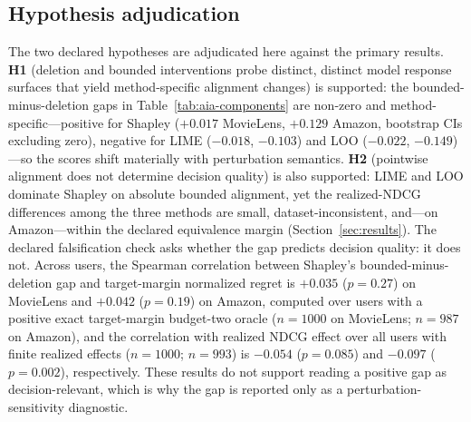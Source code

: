 \documentclass[manuscript,screen,review,anonymous]{acmart}
\begin{document}
\subsection{Hypothesis adjudication}
The two declared hypotheses are adjudicated here against the primary results. \textbf{H1} (deletion and bounded interventions probe distinct, distinct model response surfaces that yield method-specific alignment changes) is supported: the bounded-minus-deletion gaps in Table~\ref{tab:aia-components} are non-zero and method-specific---positive for Shapley ($+0.017$ MovieLens, $+0.129$ Amazon, bootstrap CIs excluding zero), negative for LIME ($-0.018$, $-0.103$) and LOO ($-0.022$, $-0.149$)---so the scores shift materially with perturbation semantics. \textbf{H2} (pointwise alignment does not determine decision quality) is also supported: LIME and LOO dominate Shapley on absolute bounded alignment, yet the realized-NDCG differences among the three methods are small, dataset-inconsistent, and---on Amazon---within the declared equivalence margin (Section~\ref{sec:results}). The declared falsification check asks whether the gap predicts decision quality: it does not. Across users, the Spearman correlation between Shapley's bounded-minus-deletion gap and target-margin normalized regret is $+0.035$ ($p=0.27$) on MovieLens and $+0.042$ ($p=0.19$) on Amazon, computed over users with a positive exact target-margin budget-two oracle ($n=1000$ on MovieLens; $n=987$ on Amazon), and the correlation with realized NDCG effect over all users with finite realized effects ($n=1000$; $n=993$) is $-0.054$ ($p=0.085$) and $-0.097$ ($p=0.002$), respectively. These results do not support reading a positive gap as decision-relevant, which is why the gap is reported only as a perturbation-sensitivity diagnostic.
\end{document}
